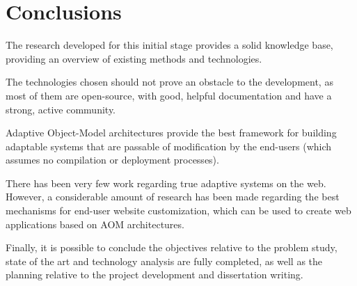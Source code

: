 \chapter{Conclusions}\label{chap:conclusions}

The research developed for this initial stage provides a solid knowledge base, providing an overview of existing methods and technologies.

The technologies chosen should not prove an obstacle to the development, as most of them are open-source, with good, helpful documentation and have a strong, active community.

Adaptive Object-Model architectures provide the best framework for building adaptable systems that are passable of modification by the end-users (which assumes no compilation or deployment processes).

There has been very few work regarding true adaptive systems on the web. However, a considerable amount of research has been made regarding the best mechanisms for end-user website customization, which can be used to create web applications based on AOM architectures. 

Finally, it is possible to conclude the objectives relative to the problem study, state of the art and technology analysis are fully completed, as well as the planning relative to the project development and dissertation writing.

